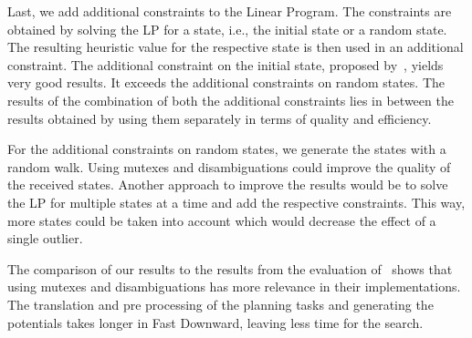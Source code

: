 Last, we add additional constraints to the Linear Program.
The constraints are obtained by solving the LP for a state, i.e., the initial state or a random state.
The resulting heuristic value for the respective state is then used in an additional constraint.
The additional constraint on the initial state, proposed by~\cite{fivser2020strengthening}, yields very good results.
It exceeds the additional constraints on random states.
The results of the combination of both the additional constraints lies in between the results obtained by using them separately in terms of quality and efficiency.

For the additional constraints on random states, we generate the states with a random walk.
Using mutexes and disambiguations could improve the quality of the received states.
Another approach to improve the results would be to solve the LP for multiple states at a time and add the respective constraints.
This way, more states could be taken into account which would decrease the effect of a single outlier.

The comparison of our results to the results from the evaluation of~\cite{fivser2020strengthening} shows that using mutexes and disambiguations has more relevance in their implementations.
The translation and pre processing of the planning tasks and generating the potentials takes longer in Fast Downward, leaving less time for the search.
